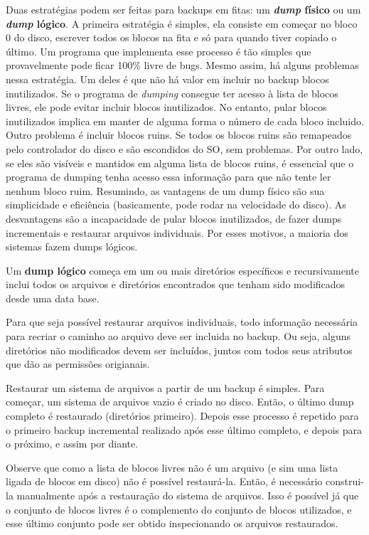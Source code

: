 \documentclass{article}
\begin{document}
Duas estratégias podem ser feitas para backups em fitas: um \textbf{\textit{dump} físico} ou um \textbf{\textit{dump} lógico}. A primeira estratégia é simples, ela consiste em começar no bloco 0 do disco, escrever todos os blocos na fita e só para quando tiver copiado o último. Um programa que implementa esse processo é tão simples que provavelmente pode ficar 100\% livre de bugs. Mesmo assim, há alguns problemas nessa estratégia. Um deles é que não há valor em incluir no backup blocos inutilizados. Se o programa de \textit{dumping} consegue ter acesso à lista de blocos livres, ele pode evitar incluir blocos inutilizados. No entanto, pular blocos inutilizados implica em manter de alguma forma o número de cada bloco incluido. Outro problema é incluir blocos ruins. Se todos os blocos ruins são remapeados pelo controlador do disco e são escondidos do SO, sem problemas. Por outro lado, se eles são visíveis e mantidos em alguma lista de blocos ruins, é essencial que o programa de dumping tenha acesso essa informação para que não tente ler nenhum bloco ruim. Resumindo, as vantagens de um dump físico são sua simplicidade e eficiência (basicamente, pode rodar na velocidade do disco). As desvantagens são a incapacidade de pular blocos inutilizados, de fazer dumps incrementais e restaurar arquivos individuais. Por esses motivos, a maioria dos sistemas fazem dumps lógicos.

Um \textbf{dump lógico} começa em um ou mais diretórios específicos e recursivamente inclui todos os arquivos e diretórios encontrados que tenham sido modificados desde uma data base.

Para que seja possível restaurar arquivos individuais, todo informação necessária para recriar o caminho ao arquivo deve ser incluida no backup. Ou seja, alguns diretórios não modificados devem ser incluídos, juntos com todos seus atributos que dão as permissões origianais. 

Restaurar um sistema de arquivos a partir de um backup é simples. Para começar, um sistema de arquivos vazio é criado no disco. Então, o último dump completo é restaurado (diretórios primeiro). Depois esse processo é repetido para o primeiro backup incremental realizado após esse último completo, e depois para o próximo, e assim por diante.

Observe que como a lista de blocos livres não é um arquivo (e sim uma lista ligada de blocos em disco) não é possível restaurá-la. Então, é necessário construi-la manualmente após a restauração do sistema de arquivos. Isso é possível já que o conjunto de blocos livres é o complemento do conjunto de blocos utilizados, e esse último conjunto pode ser obtido inspecionando os arquivos restaurados.
\end{document}
